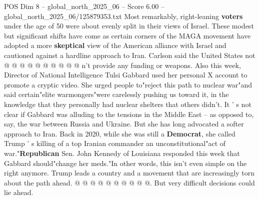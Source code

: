 \begin{textsample}{POS Dim 8 – global\_north\_2025\_06 – Score 6.00 – global\_north\_2025\_06/125879353.txt}
Most remarkably, right-leaning \textbf{voters} under the age of 50 were about evenly split in their views of Israel.
These modest but significant shifts have come as certain corners of the MAGA movement have adopted a more \textbf{skeptical} view of the American alliance with Israel and cautioned against a hardline approach to Iran.
Carlson said the United States not @ @ @ @ @ @ @ @ @ @ n't provide any funding or weapons.
Also this week, Director of National Intelligence Tulsi Gabbard used her personal X account to promote a cryptic video.
She urged people to"reject this path to nuclear war"and said certain"elite warmongers"were carelessly pushing us toward it, in the knowledge that they personally had nuclear shelters that others didn't.
It ' s not clear if Gabbard was alluding to the tensions in the Middle East -- as opposed to, say, the war between Russia and Ukraine.
But she has long advocated a softer approach to Iran.
Back in 2020, while she was still a \textbf{Democrat}, she called Trump ' s killing of a top Iranian commander an unconstitutional"act of war."\textbf{Republican} Sen.
John Kennedy of Louisiana responded this week that Gabbard should"change her meds."In other words, this isn't even simple on the right anymore.
Trump leads a country and a movement that are increasingly torn about the path ahead. @ @ @ @ @ @ @ @ @ @.
But very difficult decisions could lie ahead.

\end{textsample}
